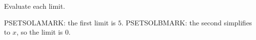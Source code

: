 \documentclass[
	pset-number = 4,
	pset-due    = {Friday, May 22, 2026},
]{pset}
\begin{document}
\maketitle

\begin{problem}[12]
	Evaluate each limit.
\end{problem}

\begin{solution}
	PSETSOLAMARK: the first limit is $5$.
	PSETSOLBMARK: the second simplifies to $x$, so the limit is $0$.
\end{solution}
\end{document}

